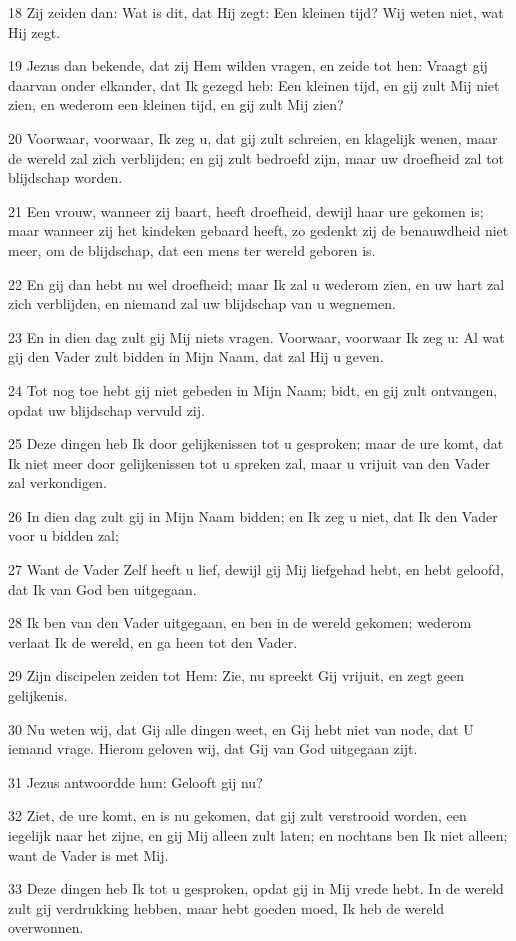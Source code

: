 \par 18 Zij zeiden dan: Wat is dit, dat Hij zegt: Een kleinen tijd? Wij weten niet, wat Hij zegt.
\par 19 Jezus dan bekende, dat zij Hem wilden vragen, en zeide tot hen: Vraagt gij daarvan onder elkander, dat Ik gezegd heb: Een kleinen tijd, en gij zult Mij niet zien, en wederom een kleinen tijd, en gij zult Mij zien?
\par 20 Voorwaar, voorwaar, Ik zeg u, dat gij zult schreien, en klagelijk wenen, maar de wereld zal zich verblijden; en gij zult bedroefd zijn, maar uw droefheid zal tot blijdschap worden.
\par 21 Een vrouw, wanneer zij baart, heeft droefheid, dewijl haar ure gekomen is; maar wanneer zij het kindeken gebaard heeft, zo gedenkt zij de benauwdheid niet meer, om de blijdschap, dat een mens ter wereld geboren is.
\par 22 En gij dan hebt nu wel droefheid; maar Ik zal u wederom zien, en uw hart zal zich verblijden, en niemand zal uw blijdschap van u wegnemen.
\par 23 En in dien dag zult gij Mij niets vragen. Voorwaar, voorwaar Ik zeg u: Al wat gij den Vader zult bidden in Mijn Naam, dat zal Hij u geven.
\par 24 Tot nog toe hebt gij niet gebeden in Mijn Naam; bidt, en gij zult ontvangen, opdat uw blijdschap vervuld zij.
\par 25 Deze dingen heb Ik door gelijkenissen tot u gesproken; maar de ure komt, dat Ik niet meer door gelijkenissen tot u spreken zal, maar u vrijuit van den Vader zal verkondigen.
\par 26 In dien dag zult gij in Mijn Naam bidden; en Ik zeg u niet, dat Ik den Vader voor u bidden zal;
\par 27 Want de Vader Zelf heeft u lief, dewijl gij Mij liefgehad hebt, en hebt geloofd, dat Ik van God ben uitgegaan.
\par 28 Ik ben van den Vader uitgegaan, en ben in de wereld gekomen; wederom verlaat Ik de wereld, en ga heen tot den Vader.
\par 29 Zijn discipelen zeiden tot Hem: Zie, nu spreekt Gij vrijuit, en zegt geen gelijkenis.
\par 30 Nu weten wij, dat Gij alle dingen weet, en Gij hebt niet van node, dat U iemand vrage. Hierom geloven wij, dat Gij van God uitgegaan zijt.
\par 31 Jezus antwoordde hun: Gelooft gij nu?
\par 32 Ziet, de ure komt, en is nu gekomen, dat gij zult verstrooid worden, een iegelijk naar het zijne, en gij Mij alleen zult laten; en nochtans ben Ik niet alleen; want de Vader is met Mij.
\par 33 Deze dingen heb Ik tot u gesproken, opdat gij in Mij vrede hebt. In de wereld zult gij verdrukking hebben, maar hebt goeden moed, Ik heb de wereld overwonnen.

